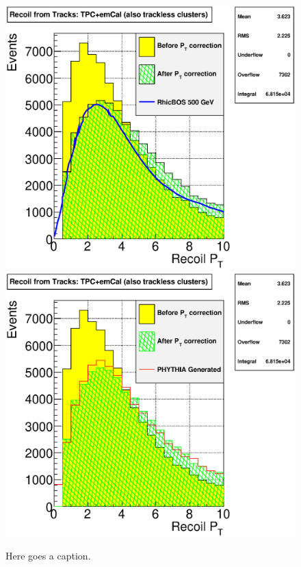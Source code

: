 \documentclass[12pt]{article}
\begin{document}
\begin{figure}[htbp]
\begin{center}
\includegraphics[scale=0.4]{images/plot_PtCorr}
\includegraphics[scale=0.4]{images/plot_PtCorr2}
\end{center}
\caption{Here goes a caption.}
\label{fig:plot_PtCorr} 
\end{figure}
\end{document}

